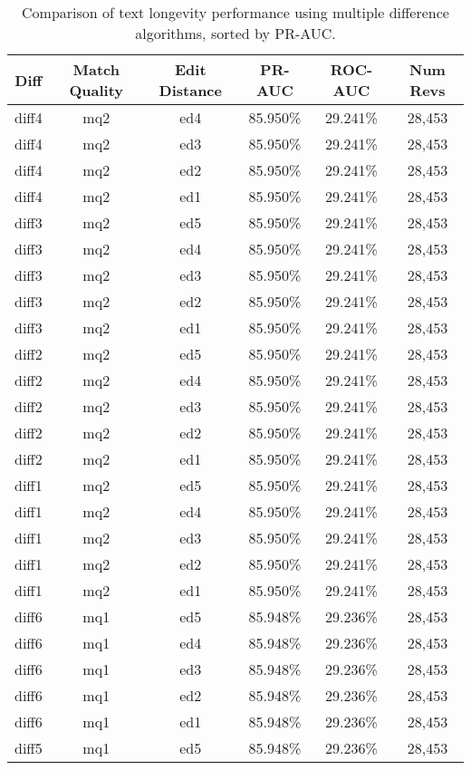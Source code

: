 \begin{table}[tbph]
\begin{center}
\begin{tabular}{|c|c|c||c|c|c|}
\hline
Diff & Match Quality & Edit Distance & PR-AUC & ROC-AUC & Num Revs \\
\hline
\hline
diff4 & mq2 & ed4 & 85.950\% & 29.241\% & 28,453 \\
diff4 & mq2 & ed3 & 85.950\% & 29.241\% & 28,453 \\
diff4 & mq2 & ed2 & 85.950\% & 29.241\% & 28,453 \\
diff4 & mq2 & ed1 & 85.950\% & 29.241\% & 28,453 \\
diff3 & mq2 & ed5 & 85.950\% & 29.241\% & 28,453 \\
diff3 & mq2 & ed4 & 85.950\% & 29.241\% & 28,453 \\
diff3 & mq2 & ed3 & 85.950\% & 29.241\% & 28,453 \\
diff3 & mq2 & ed2 & 85.950\% & 29.241\% & 28,453 \\
diff3 & mq2 & ed1 & 85.950\% & 29.241\% & 28,453 \\
diff2 & mq2 & ed5 & 85.950\% & 29.241\% & 28,453 \\
diff2 & mq2 & ed4 & 85.950\% & 29.241\% & 28,453 \\
diff2 & mq2 & ed3 & 85.950\% & 29.241\% & 28,453 \\
diff2 & mq2 & ed2 & 85.950\% & 29.241\% & 28,453 \\
diff2 & mq2 & ed1 & 85.950\% & 29.241\% & 28,453 \\
diff1 & mq2 & ed5 & 85.950\% & 29.241\% & 28,453 \\
diff1 & mq2 & ed4 & 85.950\% & 29.241\% & 28,453 \\
diff1 & mq2 & ed3 & 85.950\% & 29.241\% & 28,453 \\
diff1 & mq2 & ed2 & 85.950\% & 29.241\% & 28,453 \\
diff1 & mq2 & ed1 & 85.950\% & 29.241\% & 28,453 \\
diff6 & mq1 & ed5 & 85.948\% & 29.236\% & 28,453 \\
diff6 & mq1 & ed4 & 85.948\% & 29.236\% & 28,453 \\
diff6 & mq1 & ed3 & 85.948\% & 29.236\% & 28,453 \\
diff6 & mq1 & ed2 & 85.948\% & 29.236\% & 28,453 \\
diff6 & mq1 & ed1 & 85.948\% & 29.236\% & 28,453 \\
diff5 & mq1 & ed5 & 85.948\% & 29.236\% & 28,453 \\
\hline
\end{tabular}
\end{center}
\caption{Comparison of text longevity performance using
    multiple difference algorithms, sorted by PR-AUC.}
\label{tab:textshoutE}
\end{table}
